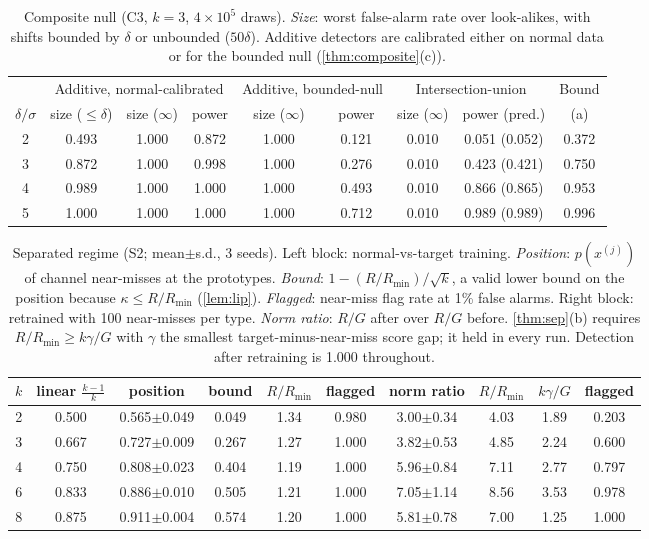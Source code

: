 \begin{table}[h]\centering\small
\caption{Composite null (C3, $k=3$, $4\times10^5$ draws). \emph{Size}: worst false-alarm rate over look-alikes, with shifts bounded by $\delta$ or unbounded ($50\delta$). Additive detectors are calibrated either on normal data or for the bounded null (\cref{thm:composite}(c)).}\label{tab:composite}
\setlength{\tabcolsep}{3pt}\begin{tabular}{ccccccccc}\toprule
 & \multicolumn{3}{c}{Additive, normal-calibrated} & \multicolumn{2}{c}{Additive, bounded-null} & \multicolumn{2}{c}{Intersection-union} & Bound\\
$\delta/\sigma$ & size ($\le\delta$) & size ($\infty$) & power & size ($\infty$) & power & size ($\infty$) & power (pred.) & (a)\\\midrule
2 & 0.493 & 1.000 & 0.872 & 1.000 & 0.121 & 0.010 & 0.051 (0.052) & 0.372\\
3 & 0.872 & 1.000 & 0.998 & 1.000 & 0.276 & 0.010 & 0.423 (0.421) & 0.750\\
4 & 0.989 & 1.000 & 1.000 & 1.000 & 0.493 & 0.010 & 0.866 (0.865) & 0.953\\
5 & 1.000 & 1.000 & 1.000 & 1.000 & 0.712 & 0.010 & 0.989 (0.989) & 0.996\\
\bottomrule\end{tabular}\end{table}

\begin{table}[h]\centering\small
\caption{Separated regime (S2; mean$\pm$s.d., 3 seeds). Left block: normal-vs-target training. \emph{Position}: $p(x^{(j)})$ of channel near-misses at the prototypes. \emph{Bound}: $1-(R/R_{\min})/\sqrt k$, a valid lower bound on the position because $\kappa\le R/R_{\min}$ (\cref{lem:lip}). \emph{Flagged}: near-miss flag rate at 1\% false alarms. Right block: retrained with 100 near-misses per type. \emph{Norm ratio}: $R/G$ after over $R/G$ before. \cref{thm:sep}(b) requires $R/R_{\min}\ge k\gamma/G$ with $\gamma$ the smallest target-minus-near-miss score gap; it held in every run. Detection after retraining is 1.000 throughout.}\label{tab:sep}
\setlength{\tabcolsep}{3pt}\begin{tabular}{cccccc|cccc}\toprule
$k$ & linear $\frac{k-1}{k}$ & position & bound & $R/R_{\min}$ & flagged & norm ratio & $R/R_{\min}$ & $k\gamma/G$ & flagged\\\midrule
2 & 0.500 & 0.565$\pm$0.049 & 0.049 & 1.34 & 0.980 & 3.00$\pm$0.34 & 4.03 & 1.89 & 0.203\\
3 & 0.667 & 0.727$\pm$0.009 & 0.267 & 1.27 & 1.000 & 3.82$\pm$0.53 & 4.85 & 2.24 & 0.600\\
4 & 0.750 & 0.808$\pm$0.023 & 0.404 & 1.19 & 1.000 & 5.96$\pm$0.84 & 7.11 & 2.77 & 0.797\\
6 & 0.833 & 0.886$\pm$0.010 & 0.505 & 1.21 & 1.000 & 7.05$\pm$1.14 & 8.56 & 3.53 & 0.978\\
8 & 0.875 & 0.911$\pm$0.004 & 0.574 & 1.20 & 1.000 & 5.81$\pm$0.78 & 7.00 & 1.25 & 1.000\\
\bottomrule\end{tabular}\end{table}

